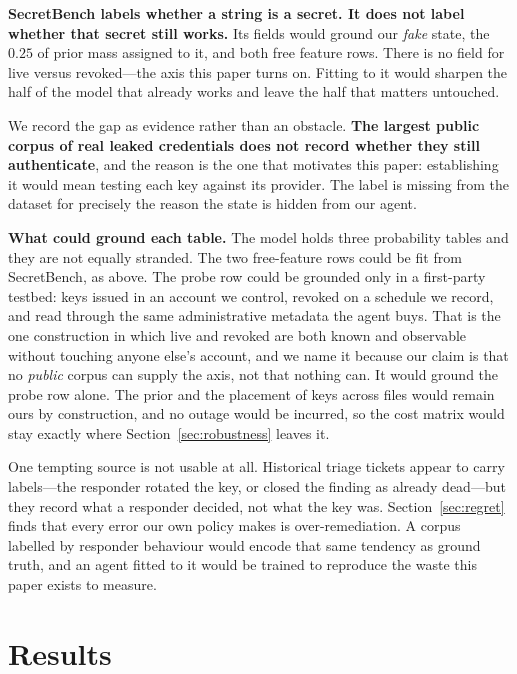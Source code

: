 \documentclass{article}
\begin{document}
\textbf{SecretBench labels whether a string is a secret. It does not label
whether that secret still works.} Its fields would ground our \emph{fake} state,
the $0.25$ of prior mass assigned to it, and both free feature rows. There is no
field for live versus revoked---the axis this paper turns on. Fitting to it
would sharpen the half of the model that already works and leave the half that
matters untouched.

We record the gap as evidence rather than an obstacle. \textbf{The largest
public corpus of real leaked credentials does not record whether they still
authenticate}, and the reason is the one that motivates this paper: establishing
it would mean testing each key against its provider. The label is missing from
the dataset for precisely the reason the state is hidden from our agent.

\textbf{What could ground each table.} The model holds three probability tables
and they are not equally stranded. The two free-feature rows could be fit from
SecretBench, as above. The probe row could be grounded only in a first-party
testbed: keys issued in an account we control, revoked on a schedule we record,
and read through the same administrative metadata the agent buys. That is the
one construction in which live and revoked are both known and observable without
touching anyone else's account, and we name it because our claim is that no
\emph{public} corpus can supply the axis, not that nothing can. It would ground
the probe row alone. The prior and the placement of keys across files would
remain ours by construction, and no outage would be incurred, so the cost matrix
would stay exactly where Section~\ref{sec:robustness} leaves it.

One tempting source is not usable at all. Historical triage tickets appear to
carry labels---the responder rotated the key, or closed the finding as already
dead---but they record what a responder decided, not what the key was.
Section~\ref{sec:regret} finds that every error our own policy makes is
over-remediation. A corpus labelled by responder behaviour would encode that
same tendency as ground truth, and an agent fitted to it would be trained to
reproduce the waste this paper exists to measure.

\section{Results}
\label{sec:results}
\end{document}
